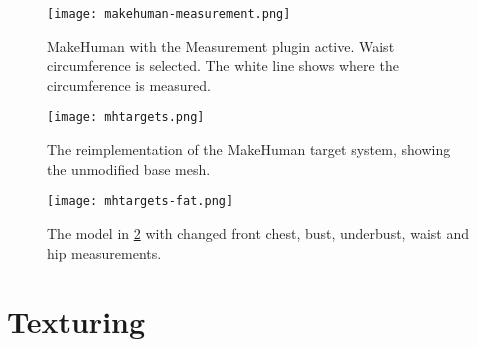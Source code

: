
\begin{figure}
    \centering
    \texttt{[image: makehuman-measurement.png]}
    \caption{MakeHuman with the Measurement plugin active. Waist circumference is selected. The white line shows where the circumference is measured.}
    \label{fig:makehuman-measurement}
\end{figure}

\begin{figure}
    \centering
    \texttt{[image: mhtargets.png]}
    \caption{The reimplementation of the MakeHuman target system, showing the unmodified base mesh.}
    \label{fig:mhtargets}
\end{figure}

\begin{figure}
    \centering
    \texttt{[image: mhtargets-fat.png]}
    \caption{The model in \ref{fig:mhtargets} with changed front chest, bust, underbust, waist and hip measurements.}
    \label{fig:mhtargets-fat}
\end{figure}

\section{Texturing}



